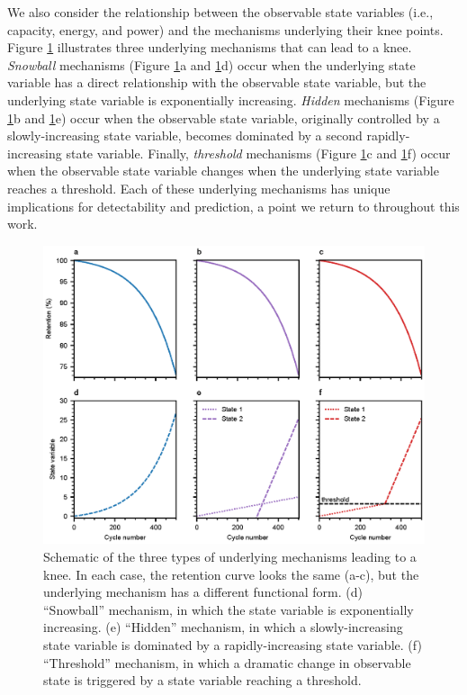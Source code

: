 \documentclass[journal=jpcl, manuscript=article, layout=onecolumn]{achemso}
\begin{document}
We also consider the relationship between the observable state variables (i.e., capacity, energy, and power) and the mechanisms underlying their knee points. Figure \ref{fig:snowball_vs_hidden_vs_threshold} illustrates three underlying mechanisms that can lead to a knee. \textit{Snowball} mechanisms (Figure \ref{fig:snowball_vs_hidden_vs_threshold}a and \ref{fig:snowball_vs_hidden_vs_threshold}d) occur when the underlying state variable has a direct relationship with the observable state variable, but the underlying state variable is exponentially increasing. \textit{Hidden} mechanisms (Figure \ref{fig:snowball_vs_hidden_vs_threshold}b and \ref{fig:snowball_vs_hidden_vs_threshold}e) occur when the observable state variable, originally controlled by a slowly-increasing state variable, becomes dominated by a second rapidly-increasing state variable. Finally, \textit{threshold} mechanisms (Figure \ref{fig:snowball_vs_hidden_vs_threshold}c and \ref{fig:snowball_vs_hidden_vs_threshold}f) occur when the observable state variable changes when the underlying state variable reaches a threshold. Each of these underlying mechanisms has unique implications for detectability and prediction, a point we return to throughout this work.

\begin{figure}[h]
    \centering
    \includegraphics[scale=1]{figures/snowball_vs_hidden_mechanism.eps}
    \caption{Schematic of the three types of underlying mechanisms leading to a knee. In each case, the retention curve looks the same (a-c), but the underlying mechanism has a different functional form. (d) ``Snowball'' mechanism, in which the state variable is exponentially increasing. (e) ``Hidden'' mechanism, in which a slowly-increasing state variable is dominated by a rapidly-increasing state variable. (f) ``Threshold'' mechanism, in which a dramatic change in observable state is triggered by a state variable reaching a threshold.}
    \label{fig:snowball_vs_hidden_vs_threshold}
\end{figure}
\end{document}

